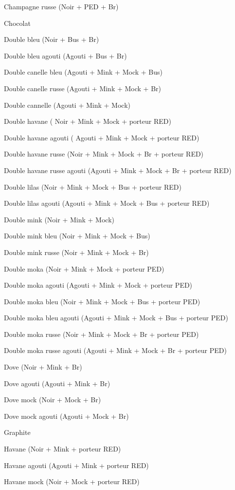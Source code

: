 \documentclass[a4paper,10pt]{article}
\begin{document}
Champagne russe (Noir + PED + Br)
 
Chocolat
 
Double bleu (Noir + Bus + Br)
 
Double bleu agouti (Agouti + Bus + Br)
 
Double canelle bleu (Agouti + Mink +   Mock + Bus)
 
Double canelle russe (Agouti + Mink + Mock + Br)
 
Double cannelle (Agouti + Mink + Mock)
 
Double havane ( Noir + Mink + Mock +   porteur RED)
 
Double havane agouti ( Agouti + Mink +   Mock + porteur RED)
 
Double havane russe (Noir + Mink + Mock   + Br + porteur RED)
 
Double havane russe agouti (Agouti +   Mink + Mock + Br + porteur RED)
 
Double lilas (Noir + Mink + Mock + Bus +   porteur RED)
 
Double lilas agouti (Agouti + Mink +   Mock + Bus + porteur RED)
 
Double mink (Noir + Mink + Mock)
 
Double mink bleu (Noir + Mink + Mock +   Bus)
 
Double mink russe (Noir + Mink + Mock +   Br)
 
Double moka (Noir + Mink + Mock +   porteur PED)
 
Double moka agouti (Agouti + Mink + Mock   + porteur PED)
 
Double moka bleu (Noir + Mink + Mock +   Bus + porteur PED)
 
Double moka bleu agouti (Agouti + Mink +   Mock + Bus + porteur PED)
 
Double moka russe (Noir + Mink + Mock +   Br + porteur PED)
 
Double moka russe agouti (Agouti + Mink   + Mock + Br + porteur PED)
 
Dove (Noir + Mink + Br)
 
Dove agouti   (Agouti + Mink + Br)
 
Dove mock (Noir + Mock + Br)
 
Dove mock agouti   (Agouti + Mock + Br)
 
Graphite
 
Havane (Noir + Mink + porteur RED)
 
Havane agouti (Agouti + Mink + porteur   RED)
 
Havane mock (Noir + Mock + porteur RED)
 
\end{document}
